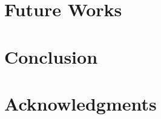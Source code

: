 \documentclass[11pt]{article}
\begin{document}


\section{Future Works}

\section{Conclusion}

\section*{Acknowledgments}



\end{document}
